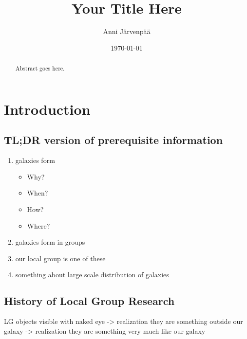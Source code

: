 \documentclass[english, oneside]{HYgradu}
\title{Your Title Here}
\author{Anni Järvenpää}
\date{\today}
\begin{document}
\maketitle

\begin{abstract}
Abstract goes here.
\end{abstract}

\mytableofcontents


\chapter{Introduction}

\section{TL;DR version of prerequisite information}
\begin{enumerate}
	\item galaxies form
	\begin{itemize}
		\item Why?
		\item When?
		\item How?
		\item Where?
	\end{itemize}
	\item galaxies form in groups
	\item our local group is one of these
	\item something about large scale distribution of galaxies
\end{enumerate}

\section{History of Local Group Research}
LG objects visible with naked eye -> realization they are something outside our galaxy -> realization they are something very much like our galaxy
\end{document}
